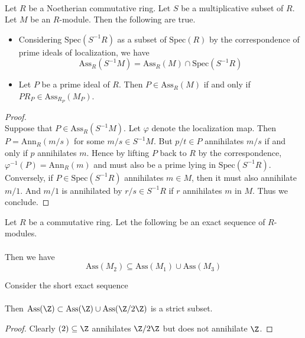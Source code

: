 \documentclass[a4paper]{article}
\begin{document}
\begin{prp}{}{}\\
Let $R$ be a Noetherian commutative ring. Let $S$ be a multiplicative subset of $R$. Let $M$ be an $R$-module. Then the following are true. 
\begin{itemize}
\item Considering $\text{Spec}(S^{-1}R)$ as a subset of $\text{Spec}(R)$ by the correspondence of prime ideals of localization, we have $$\text{Ass}_R(S^{-1}M)=\text{Ass}_R(M)\cap\text{Spec}(S^{-1}R)$$
\item Let $P$ be a prime ideal of $R$. Then $P\in\text{Ass}_R(M)$ if and only if $PR_P\in\text{Ass}_{R_P}(M_P)$. 
\end{itemize}
\begin{proof}\\
Suppose that $P\in\text{Ass}_R(S^{-1}M)$. Let $\varphi$ denote the localization map. Then $P=\text{Ann}_R(m/s)$ for some $m/s\in S^{-1}M$. But $p/t\in P$ annihilates $m/s$ if and only if $p$ annihilates $m$. Hence by lifting $P$ back to $R$ by the correspondence, $\varphi^{-1}(P)=\text{Ann}_R(m)$ and must also be a prime lying in $\text{Spec}(S^{-1}R)$. \\

Conversely, if $P\in\text{Spec}(S^{-1}R)$ annihilates $m\in M$, then it must also annihilate $m/1$. And $m/1$ is annihilated by $r/s\in S^{-1}R$ if $r$ annihilates $m$ in $M$. Thus we conclude. 
\end{proof}
\end{prp}

\begin{prp}{}{} Let $R$ be a commutative ring. Let the following be an exact sequence of $R$-modules. \\
\\
Then we have $$\text{Ass}(M_2)\subseteq\text{Ass}(M_1)\cup\text{Ass}(M_3)$$
\end{prp}

\begin{eg}{}{} Consider the short exact sequence \\
\\
Then $\text{Ass}(\Z)\subset\text{Ass}(\Z)\cup\text{Ass}(\Z/2\Z)$ is a strict subset. 
\begin{proof}
Clearly $(2)\subseteq\Z$ annihilates $\Z/2\Z$ but does not annihilate $\Z$. 
\end{proof}
\end{eg}
\end{document}
